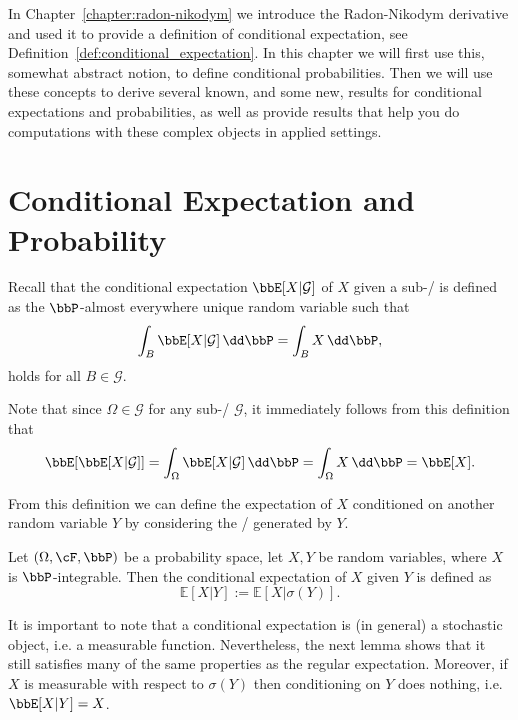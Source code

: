 

In Chapter~\ref{chapter:radon-nikodym} we introduce the Radon-Nikodym derivative and used it to provide a definition of conditional expectation, see Definition~\ref{def:conditional_expectation}. In this chapter we will first use this, somewhat abstract notion, to define conditional probabilities. Then we will use these concepts to derive several known, and some new, results for conditional expectations and probabilities, as well as provide results that help you do computations with these complex objects in applied settings.


\section{Conditional Expectation and Probability}

Recall that the conditional expectation $\bbE[X|\mathcal{G}]$ of $X$ given a sub-\sigalg/ is defined as the $\bbP$-almost everywhere unique random variable such that
\[
	\int_B \bbE[X|\mathcal{G}] \, \dd \bbP = \int_B X \, \dd \bbP,
\]
holds for all $B \in \mathcal{G}$.

Note that since $\Omega \in \mathcal{G}$ for any sub-\sigalg/ $\mathcal{G}$, it immediately follows from this definition that
\begin{equation}\label{eq:law_total_expectation}
	\bbE[\bbE[X|\mathcal{G}]] = \int_\Omega \bbE[X|\mathcal{G}] \, \dd \bbP = \int_\Omega X \, \dd \bbP = \bbE[X].
\end{equation}

From this definition we can define the expectation of $X$ conditioned on another random variable $Y$ by considering the \sigalg/ generated by $Y$.

\begin{definition}
Let $(\Omega, \cF, \bbP)$ be a probability space, let $X,Y$ be random variables, where $X$ is $\bbP$-integrable. Then the conditional expectation of $X$ given $Y$ is defined as
\[
\mathbb{E}[X | Y] := \mathbb{E}[ X | \sigma(Y) ].
\]	
\end{definition}


It is important to note that a conditional expectation is (in general) a stochastic object, i.e. a measurable function. Nevertheless, the next lemma shows that it still satisfies many of the same properties as the regular expectation. Moreover, if $X$ is measurable with respect to $\sigma(Y)$ then conditioning on $Y$ does nothing, i.e. $\bbE[X|Y] = X$.

